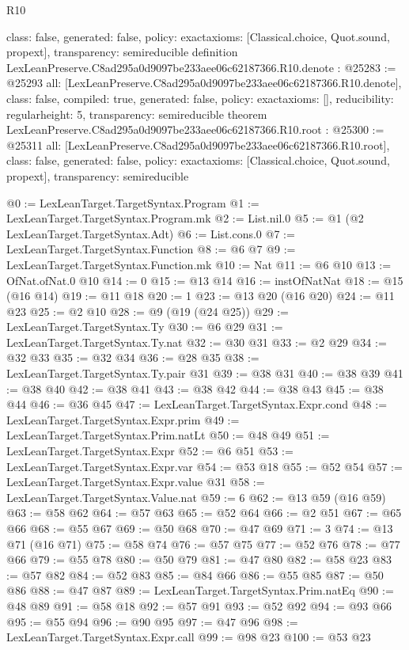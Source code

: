 \begin{lexlean}{R10}
\begin{coremodule}
{  class: false,
  generated: false,
  policy: exact{axioms: [Classical.choice, Quot.sound, propext]},
  transparency: semireducible
}
definition LexLeanPreserve.C8ad295a0d9097be233aee06c62187366.R10.denote : @25283 := @25293 {
  all: [LexLeanPreserve.C8ad295a0d9097be233aee06c62187366.R10.denote],
  class: false,
  compiled: true,
  generated: false,
  policy: exact{axioms: []},
  reducibility: regular{height: 5},
  transparency: semireducible
}
theorem LexLeanPreserve.C8ad295a0d9097be233aee06c62187366.R10.root : @25300 := @25311 {
  all: [LexLeanPreserve.C8ad295a0d9097be233aee06c62187366.R10.root],
  class: false,
  generated: false,
  policy: exact{axioms: [Classical.choice, Quot.sound, propext]},
  transparency: semireducible
}

@0 := LexLeanTarget.TargetSyntax.Program
@1 := LexLeanTarget.TargetSyntax.Program.mk
@2 := List.nil.{0}
@5 := @1 (@2 LexLeanTarget.TargetSyntax.Adt)
@6 := List.cons.{0}
@7 := LexLeanTarget.TargetSyntax.Function
@8 := @6 @7
@9 := LexLeanTarget.TargetSyntax.Function.mk
@10 := Nat
@11 := @6 @10
@13 := OfNat.ofNat.{0} @10
@14 := 0
@15 := @13 @14
@16 := instOfNatNat
@18 := @15 (@16 @14)
@19 := @11 @18
@20 := 1
@23 := @13 @20 (@16 @20)
@24 := @11 @23
@25 := @2 @10
@28 := @9 (@19 (@24 @25))
@29 := LexLeanTarget.TargetSyntax.Ty
@30 := @6 @29
@31 := LexLeanTarget.TargetSyntax.Ty.nat
@32 := @30 @31
@33 := @2 @29
@34 := @32 @33
@35 := @32 @34
@36 := @28 @35
@38 := LexLeanTarget.TargetSyntax.Ty.pair @31
@39 := @38 @31
@40 := @38 @39
@41 := @38 @40
@42 := @38 @41
@43 := @38 @42
@44 := @38 @43
@45 := @38 @44
@46 := @36 @45
@47 := LexLeanTarget.TargetSyntax.Expr.cond
@48 := LexLeanTarget.TargetSyntax.Expr.prim
@49 := LexLeanTarget.TargetSyntax.Prim.natLt
@50 := @48 @49
@51 := LexLeanTarget.TargetSyntax.Expr
@52 := @6 @51
@53 := LexLeanTarget.TargetSyntax.Expr.var
@54 := @53 @18
@55 := @52 @54
@57 := LexLeanTarget.TargetSyntax.Expr.value @31
@58 := LexLeanTarget.TargetSyntax.Value.nat
@59 := 6
@62 := @13 @59 (@16 @59)
@63 := @58 @62
@64 := @57 @63
@65 := @52 @64
@66 := @2 @51
@67 := @65 @66
@68 := @55 @67
@69 := @50 @68
@70 := @47 @69
@71 := 3
@74 := @13 @71 (@16 @71)
@75 := @58 @74
@76 := @57 @75
@77 := @52 @76
@78 := @77 @66
@79 := @55 @78
@80 := @50 @79
@81 := @47 @80
@82 := @58 @23
@83 := @57 @82
@84 := @52 @83
@85 := @84 @66
@86 := @55 @85
@87 := @50 @86
@88 := @47 @87
@89 := LexLeanTarget.TargetSyntax.Prim.natEq
@90 := @48 @89
@91 := @58 @18
@92 := @57 @91
@93 := @52 @92
@94 := @93 @66
@95 := @55 @94
@96 := @90 @95
@97 := @47 @96
@98 := LexLeanTarget.TargetSyntax.Expr.call
@99 := @98 @23
@100 := @53 @23

\end{coremodule}
\end{lexlean}
